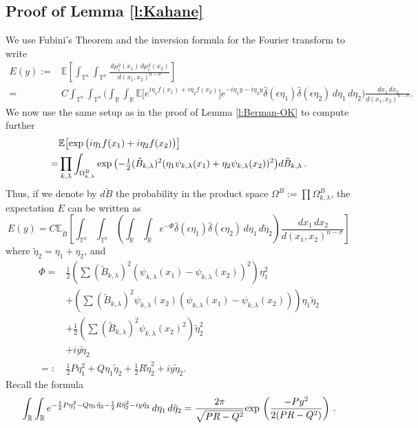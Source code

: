 \documentclass[11pt,reqno]{amsart}
\newcommand{\R}{\mathbb R}
\newcommand{\T}{{\mathbb T}}
\newcommand{\E}{{\mathbb E}}
\renewcommand{\exp}{{\rm exp}\,}
\theoremstyle{definition}
\numberwithin{equation}{section}
\begin{document}
\subsection{Proof of Lemma \ref{l:Kahane}} We use Fubini's Theorem and the inversion formula for the Fourier transform to write
\begin{align*}
E (y) := &\E \left [\int_{\T^n}\int_{\T^n}\frac{\,d\mu_\epsilon^y(x_1)\,d\mu_\epsilon^y(x_2)}{d(x_1,x_2)^{n-\sigma}}\right]\\
 = &C\int_{\T^n}\int_{\T^n}\Big(\int_\R\int_\R \E \bigl[e^{i\eta_1f(x_1)+i\eta_2f(x_2)}\bigr]e^{-i\eta_1y-i\eta_2y}\hat{\delta}(\epsilon\eta_1)\hat{\delta}(\epsilon\eta_2)\,d\eta_1\,d\eta_2\Big)\frac{\,dx_1\,dx_2}{d(x_1,x_2)^{n-\sigma}}.
\end{align*}
We now use the same setup as in the proof of Lemma \ref{l:Berman-OK} to compute further
\begin{align*}
& \E \bigl[ \exp \bigl(i\eta_1f(x_1)+i\eta_2f(x_2)\bigr)\bigr]\\
= & \prod_{k, \lambda} \int_{\Omega^B_{k,\lambda}} \exp \bigl(-\tfrac{1}{2} (\tilde{B}_{k,\lambda})^2(\eta_1\psi_{k,\lambda}(x_1)+\eta_2\psi_{k,\lambda}(x_2))^2\bigr) d\tilde{B}_{k,\lambda}\, .
\end{align*}
Thus, if we denote by $d \tilde{B}$ the probability in the product space $\Omega^B := \prod \Omega^B_{k, \lambda}$, 
the expectation $E$ can be written as
\[
E (y) =C\E_{\tilde{B}} \left[\int_{\T^n}\int_{\T^n}\left(\int_\R\int_\R e^{-\Phi }\hat{\delta}(\epsilon\eta_1)\hat{\delta}(\epsilon\eta_2)\,d\eta_1\,d\tilde{\eta}_2\right)\frac{\,dx_1\,dx_2}{d(x_1,x_2)^{n-\sigma}}\right]\]
where $\tilde{\eta}_2=\eta_1+\eta_2$, and
\begin{align*}
\Phi
= &\frac{1}{2}\left(\sum (\tilde{B}_{k,\lambda})^2(\psi_{k,\lambda}(x_1)-\psi_{k,\lambda}(x_2))^2\right)\eta_1^2\\
&+\left(\sum (\tilde{B}_{k,\lambda})^2\psi_{k,\lambda}(x_2)(\psi_{k,\lambda}(x_1)-\psi_{k,\lambda}(x_2))\right)\eta_1\tilde{\eta}_2\\
&+\frac{1}{2}\left(\sum (\tilde{B}_{k,\lambda})^2\psi_{k,\lambda}(x_2)^2\right)\tilde{\eta}_2^2\\
&+iy\tilde{\eta}_2\\
=: &\frac{1}{2}P\eta_1^2+Q\eta_1\tilde{\eta}_2+\frac{1}{2}R\tilde{\eta}_2^2+iy\tilde{\eta}_2.
\end{align*}
Recall the formula
\begin{equation}\label{e:domination}
\int_{\R}\int_{\R} e^{-\frac{1}{2}P\eta_1^2-Q\eta_1\tilde{\eta}_2-\frac{1}{2}R\tilde{\eta}_2^2-iy\tilde{\eta}_2}\,d\eta_1\,d\tilde{\eta}_2=\frac{2\pi}{\sqrt{PR-Q^2}}\exp \left(\frac{-Py^2}{2(PR-Q^2)}\right)\, .
\end{equation}
\end{document}
